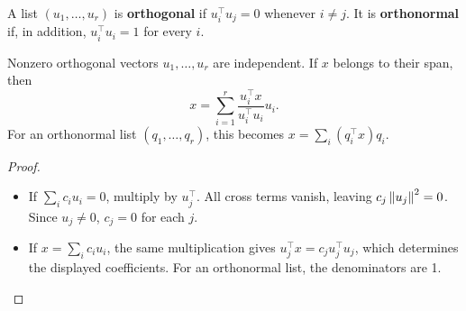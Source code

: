 A list \((u_1,\ldots,u_r)\) is
\textbf{orthogonal} if \(u_i^\top u_j=0\) whenever \(i\ne j\).
It is \textbf{orthonormal} if, in addition, \(u_i^\top u_i=1\) for every \(i\).

\begin{proposition}\label{prop:06:orthogonal-list}
Nonzero orthogonal vectors \(u_1,\ldots,u_r\) are independent.
If \(x\) belongs to their span, then
\[
x=\sum_{i=1}^r\frac{u_i^\top x}{u_i^\top u_i}u_i.
\]
For an orthonormal list \((q_1,\ldots,q_r)\), this becomes
\(x=\sum_i(q_i^\top x)q_i\).
\end{proposition}
\begin{proof}
\begin{itemize}
\item If \(\sum_i c_i u_i=0\), multiply by \(u_j^\top\).
  All cross terms vanish, leaving \(c_j\left\lVert u_j\right\rVert^2=0\).
  Since \(u_j\ne0\), \(c_j=0\) for each \(j\).
\item If \(x=\sum_i c_i u_i\), the same multiplication gives
  \(u_j^\top x=c_j u_j^\top u_j\), which determines the displayed
  coefficients. For an orthonormal list, the denominators are 1.
\end{itemize}
\end{proof}

